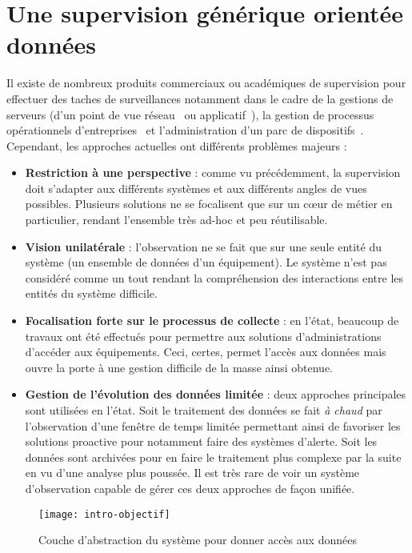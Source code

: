 \section{Une supervision générique orientée données}\label{sec:intro:objectif}
Il existe de nombreux produits commerciaux ou académiques de supervision pour effectuer des taches de surveillances notamment dans le cadre de la gestions de serveurs (d'un point de vue réseau~\cite{gestionequipreseau} ou applicatif~\cite{supervisionapache}), la gestion de processus opérationnels d'entreprises~\cite{google:businessprocesssupervision} et l'administration d'un parc de dispositifs~\cite{snmp:thesemehdi}. Cependant, les approches actuelles ont différents problèmes majeurs :
\begin{itemize}
    \item \textbf{Restriction à une perspective} : comme vu précédemment, la supervision doit s'adapter aux différents systèmes et aux différents angles de vues possibles. Plusieurs solutions ne se focalisent que sur un cœur de métier en particulier, rendant l'ensemble très ad-hoc et peu réutilisable.
    \item \textbf{Vision unilatérale} : l'observation ne se fait que sur une seule entité du système (un ensemble de données d'un équipement). Le système n'est pas considéré comme un tout rendant la compréhension des interactions entre les entités du système difficile.
    \item \textbf{Focalisation forte sur le processus de collecte} : en l'état, beaucoup de travaux ont été effectués pour permettre aux solutions d'administrations d'accéder aux équipements. Ceci, certes, permet l'accès aux données mais ouvre la porte à une gestion difficile de la masse ainsi obtenue.
    \item \textbf{Gestion de l'évolution des données limitée} : deux approches principales sont utilisées en l'état. Soit le traitement des données se fait \textit{à chaud} par l'observation d'une fenêtre de temps limitée permettant ainsi de favoriser les solutions proactive pour notamment faire des systèmes d'alerte. Soit les données sont archivées pour en faire le traitement plus complexe par la suite en vu d'une analyse plus poussée. Il est très rare de voir un système d'observation capable de gérer ces deux approches de façon unifiée. 
\end{itemize}

\begin{figure}
\centering
\texttt{[image: intro-objectif]}
\caption{Couche d'abstraction du système pour donner accès aux données}\label{fig:intro:objectif:abstraction}
\end{figure}


